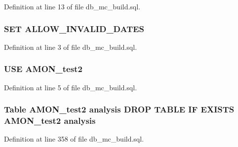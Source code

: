 Definition at line 13 of file db\-\_\-mc\-\_\-build.\-sql.

\hypertarget{db__mc__build_8sql_adbed2a6ee14af6c05021f7e12cda5f6c}{
\subsubsection[{A\-L\-L\-O\-W\-\_\-\-I\-N\-V\-A\-L\-I\-D\-\_\-\-D\-A\-T\-E\-S}]{\setlength{\rightskip}{0pt plus 5cm}S\-E\-T A\-L\-L\-O\-W\-\_\-\-I\-N\-V\-A\-L\-I\-D\-\_\-\-D\-A\-T\-E\-S}}\label{db__mc__build_8sql_adbed2a6ee14af6c05021f7e12cda5f6c}


Definition at line 3 of file db\-\_\-mc\-\_\-build.\-sql.

\hypertarget{db__mc__build_8sql_a19c21c59303d8b6591b92240ff7de1d5}{
\subsubsection[{A\-M\-O\-N\-\_\-test2}]{\setlength{\rightskip}{0pt plus 5cm}U\-S\-E A\-M\-O\-N\-\_\-test2}}\label{db__mc__build_8sql_a19c21c59303d8b6591b92240ff7de1d5}


Definition at line 5 of file db\-\_\-mc\-\_\-build.\-sql.

\hypertarget{db__mc__build_8sql_a69c1258a339f0520ae8780c2caf56220}{
\subsubsection[{analysis}]{\setlength{\rightskip}{0pt plus 5cm}Table {\bf A\-M\-O\-N\-\_\-test2} analysis D\-R\-O\-P T\-A\-B\-L\-E I\-F E\-X\-I\-S\-T\-S {\bf A\-M\-O\-N\-\_\-test2} analysis}}\label{db__mc__build_8sql_a69c1258a339f0520ae8780c2caf56220}


Definition at line 358 of file db\-\_\-mc\-\_\-build.\-sql.

